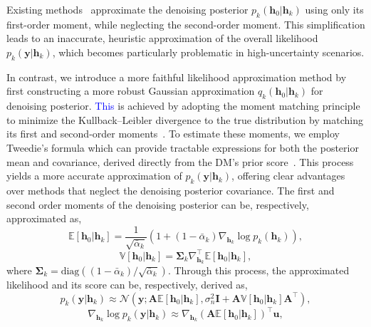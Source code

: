 \documentclass[lettersize,journal]{IEEEtran}
\newcommand{\tblue}{\textcolor{blue}}
\begin{document}
Existing methods~\cite{arvinteMIMOChannelEstimation2023,zhouGenerativeDiffusionModels2025} approximate the denoising posterior $p_{k}(\mathbf{h}_{0}|\mathbf{h}_{k})$ using only its first-order moment, while neglecting the second-order moment. This simplification leads to an inaccurate, heuristic approximation of the overall likelihood $p_{k}(\mathbf{y}|\mathbf{h}_{k})$, which becomes particularly problematic in high-uncertainty scenarios.

In contrast, we introduce a more faithful likelihood approximation method by first constructing a more robust Gaussian approximation $q_{k}(\mathbf{h}_{0}|\mathbf{h}_{k})$ for denoising posterior. \tblue{This} is achieved by adopting the moment matching principle to minimize the Kullback–Leibler divergence to the true distribution by matching its first and second-order moments~\cite{bishopPatternRecognitionMachine2006}. To estimate these moments, we employ Tweedie's formula which can provide tractable expressions for both the posterior mean and covariance, derived directly from the DM's prior score~\cite{efronTweediesFormulaSelection2011}. This process yields a more accurate approximation of $p_{k}(\mathbf{y}|\mathbf{h}_{k})$, offering clear advantages over methods that neglect the denoising posterior covariance. The first and second order moments of the denoising posterior can be, respectively, approximated as,
\begin{equation}
\label{eq:first_moment}
\mathbb{E}[\mathbf{h}_{0}|\mathbf{h}_{k}] = \frac{1}{\sqrt{ \bar{\alpha}_{k} }}(1+(1-\bar{\alpha}_{k})\nabla_{\mathbf{h}_{k}}\log p_{k}(\mathbf{h}_{k})),
\end{equation}
\begin{equation}
\label{eq:second_moment}
\mathbb{V}[\mathbf{h}_{0}|\mathbf{h}_{k}] = \boldsymbol{\Sigma}_{k}\nabla_{\mathbf{h}_{k}}^{\top}\mathbb{E}[\mathbf{h}_{0}|\mathbf{h}_{k}],
\end{equation}
where $\boldsymbol{\Sigma}_{k} = \text{diag}((1-\bar{\alpha}_{k}) / \sqrt{ \bar{\alpha}_{k} })$. Through this process, the approximated likelihood and its score can be, respectively, derived as,
\begin{equation}
\label{eq:likelihood_approx}
p_{k}(\mathbf{y}|\mathbf{h}_{k}) \approx \mathcal{N}(\mathbf{y}; \mathbf{A}\mathbb{E}[\mathbf{h}_{0}|\mathbf{h}_{k}], \sigma_{n}^{2}\mathbf{I}+\mathbf{A}\mathbb{V}[\mathbf{h}_{0}|\mathbf{h}_{k}]\mathbf{A}^{\top}),
\end{equation}
\begin{equation}
\label{eq:likelihood_score_approx}
\nabla_{\mathbf{h}_{k}}\log p_{k}(\mathbf{y}|\mathbf{h}_{k}) \approx \nabla_{\mathbf{h}_{k}} (\mathbf{A}\mathbb{E}[\mathbf{h}_{0}|\mathbf{h}_{k}])^{\top}\mathbf{u},
\end{equation}
\end{document}
